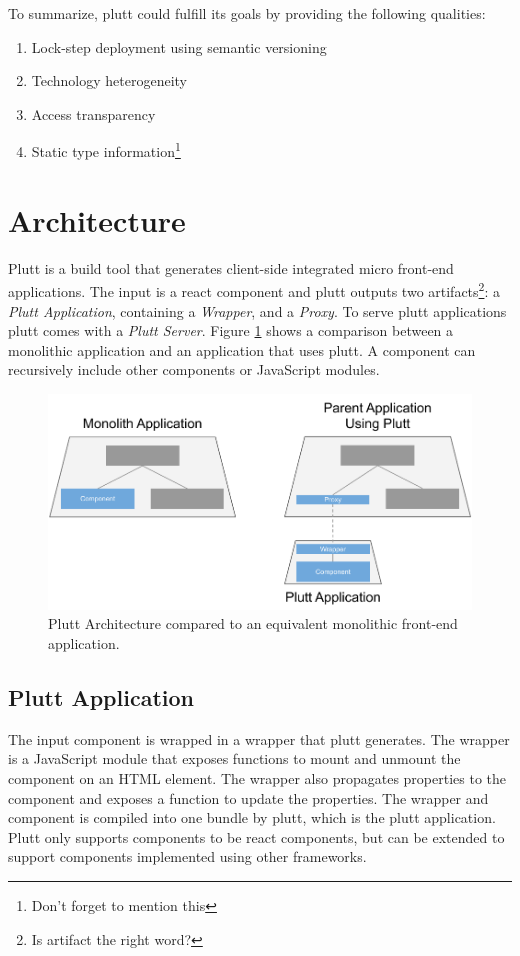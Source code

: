 To summarize, plutt could fulfill its goals by providing the following qualities:

\begin{enumerate}
    \item Lock-step deployment using semantic versioning
    \item Technology heterogeneity
    \item Access transparency
    \item Static type information\footnote{Don't forget to mention this}
\end{enumerate}

\section{Architecture}

Plutt is a build tool that generates client-side integrated micro front-end applications. The input is a react component and plutt outputs two artifacts\footnote{Is artifact the right word?}: a \textit{Plutt Application}, containing a \textit{Wrapper}, and a \textit{Proxy}. To serve plutt applications plutt comes with a \textit{Plutt Server}. Figure \ref{fig:plutt-architecture} shows a comparison between a monolithic application and an application that uses plutt. A component can recursively include other components or JavaScript modules.


\begin{figure}
    \centering
    \includegraphics[width=\linewidth]{images/plutt-architecture.pdf}
    \caption{Plutt Architecture compared to an equivalent monolithic front-end application.}
    \label{fig:plutt-architecture}
\end{figure}

\subsection{Plutt Application}
The input component is wrapped in a wrapper that plutt generates. The wrapper is a JavaScript module that exposes functions to mount and unmount the component on an HTML element. The wrapper also propagates properties to the component and exposes a function to update the properties. The wrapper and component is compiled into one bundle by plutt, which is the plutt application. Plutt only supports components to be react components, but can be extended to support components implemented using other frameworks.

